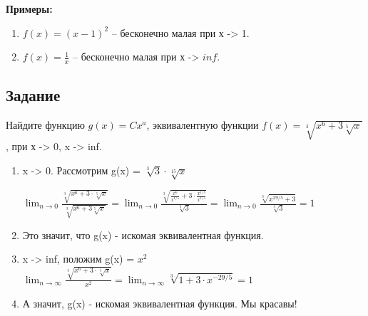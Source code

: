 \documentclass[a4paper,12pt]{article}
\begin{document}
    \textbf{Примеры:}
        \begin{enumerate}
            \item $f(x) = (x-1)^2$ -- бесконечно малая при х -> 1.
             \item $f(x) = \frac{1}{x}$ -- бесконечно малая при х -> $inf$.
        \end{enumerate}
   
    
        \subsection*{Задание}
        Найдите функцию $g(x) = Cx^a$, эквивалентную функции $f(x)= \sqrt[3]{x^6+3\sqrt[5]{x}}$, при х -> 0, x -> inf.
            \begin{enumerate}
                \item x -> 0. Рассмотрим g(x) = $\sqrt[3]{3}\cdot\sqrt[15]{x}$
                
                $\displaystyle \lim_{n\rightarrow 0} 
                   \frac{
                       \sqrt[3]{x^6+3\cdot \sqrt[5]{x}}
                   }
                   {
                   \sqrt[3]{x^6+3\sqrt[5]{x}}
                   }
                   =
                   \displaystyle \lim_{n\rightarrow 0} 
                   \frac{
                       \sqrt[3]{\frac{x^6}{x^{1/5}} + 3 \cdot \frac{x^{1/5}}{x^{1/5}}}
                   }
                   {
                   \sqrt[3]{3}
                   }
                   =
                   \displaystyle \lim_{n\rightarrow 0} 
                   \frac{
                       \sqrt[3]{x^{29/5} + 3}
                   }
                   {
                   \sqrt[3]{3}
                   }
                   = 
                   1
    $    
                \item Это значит, что g(x) - искомая эквивалентная функция.
                
                \item x -> inf, положим g(x) = $x^2$
                $\displaystyle \lim_{n\rightarrow \infty} 
                   \frac{
                       \sqrt[3]{x^6+3\cdot \sqrt[5]{x}}
                   }
                   {
                   x^2
                   }
                   =
                   \displaystyle \lim_{n\rightarrow \infty} 
                       \sqrt[3]{1 + 3 \cdot x^{-29/5}}
                   = 
                   1
    $    
        \item А значит, g(x) - искомая эквивалентная функция. Мы красавы!
            \end{enumerate}
\end{document}
